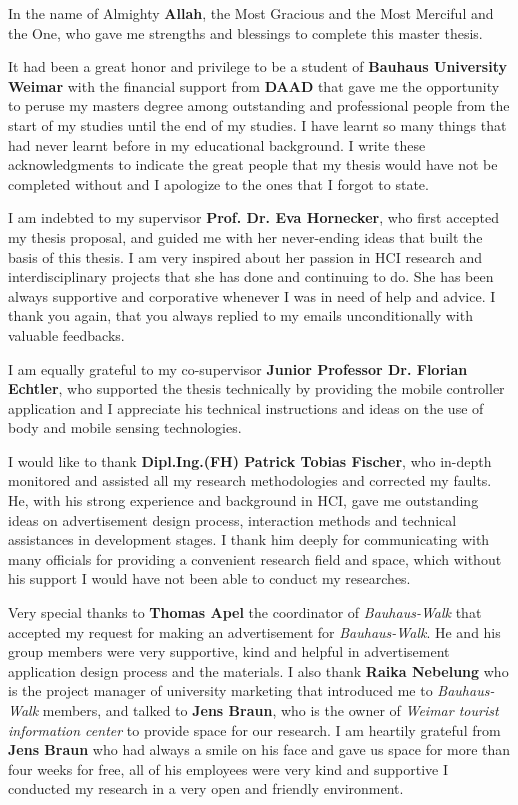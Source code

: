 
\begin{acknowledgements}
\addchaptertocentry{\acknowledgementname} %
 
 
In the name of Almighty \textbf{Allah}, the Most Gracious and the Most Merciful and the One, who gave me strengths and blessings to complete this master thesis. 

It had been a great honor and privilege to be a student of \textbf{Bauhaus University Weimar} with the financial support from \textbf{DAAD} that gave me the opportunity to peruse my masters degree among outstanding and professional people from the start of my studies until the end of my studies. I have learnt so many things that had never learnt before in my educational background. I write these acknowledgments to indicate the great people that my thesis would have not be completed without and I apologize to the ones that I forgot to state. 

I am indebted to my supervisor \textbf{Prof. Dr. Eva Hornecker}, who first accepted my thesis proposal, and guided me with her never-ending ideas that built the basis of this thesis. I am very inspired about her passion in HCI research and interdisciplinary projects that she has done and continuing to do. She has been always supportive and corporative whenever I was in need of help and advice. I thank you again, that you always replied to my emails unconditionally with valuable feedbacks.  

I am equally grateful to my co-supervisor \textbf{Junior Professor Dr. Florian Echtler}, who supported the thesis technically by providing the mobile controller application and I appreciate his technical instructions and ideas on the use of body and mobile sensing technologies.

I would like to thank \textbf{Dipl.Ing.(FH) Patrick Tobias Fischer}, who in-depth monitored and assisted all my research methodologies and corrected my faults. He, with his strong experience and background in HCI, gave me outstanding ideas on advertisement design process, interaction methods and technical assistances in development stages. I thank him deeply for communicating with many officials for providing a convenient research field and space, which without his support I would have not been able to conduct my researches.

Very special thanks to \textbf{Thomas Apel} the coordinator of  \emph{Bauhaus-Walk} that accepted my request for making an advertisement for \emph{Bauhaus-Walk}. He and his group members were very supportive, kind and helpful in advertisement application design process and the materials. I also thank \textbf{Raika Nebelung} who is the project manager of university marketing that introduced me to \emph{Bauhaus-Walk} members, and talked to \textbf{Jens Braun}, who is the owner of \emph{Weimar tourist information center} to provide space for our research. I am heartily grateful from \textbf{Jens Braun} who had always a smile on his face and gave us space for more than four weeks for free, all of his employees were very kind and supportive I conducted my research in a very open and friendly environment. 


\end{acknowledgements}
